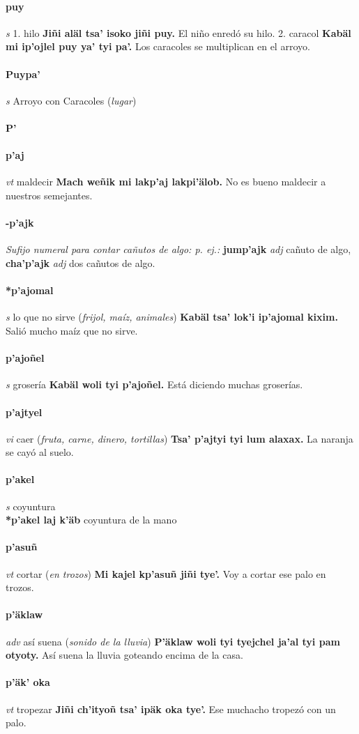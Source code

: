 \documentclass{scrbook}
\newcommand{\entry}[1]{\paragraph{#1}}
\newcommand{\alphaletter}[1]{\addsec{#1}}
\newcommand{\onedefinition}[1]{#1.}
\newcommand{\nontranslationdef}[1]{\textit{#1}}
\newcommand{\partofspeech}[1]{\textit{#1}}
\newcommand{\spanishtranslation}[1]{#1}
\newcommand{\clarification}[1]{(\textit{#1})}
\newcommand{\cholexample}[1]{\textbf{#1}}
\newcommand{\exampletranslation}[1]{#1}
\newcommand{\secondaryentry}[1]{\\\textbf{#1}}
\newcommand{\secondtranslation}[1]{#1}
\begin{document}
\begin{multicols}{2}
\entry{puy}
\partofspeech{s}
\onedefinition{1}
\spanishtranslation{hilo}
\cholexample{Jiñi aläl tsa' isoko jiñi puy.}
\exampletranslation{El niño enredó su hilo.}
\onedefinition{2}
\spanishtranslation{caracol}
\cholexample{Kabäl mi ip'ojlel puy ya' tyi pa'.}
\exampletranslation{Los caracoles se multiplican en el arroyo.}

\entry{Puypa'}
\partofspeech{s}
\spanishtranslation{Arroyo con Caracoles}
\clarification{lugar}

\entry{P'}
\alphaletter{P'}

\entry{p'aj}
\partofspeech{vt}
\spanishtranslation{maldecir}
\cholexample{Mach weñik mi lakp'aj lakpi'älob.}
\exampletranslation{No es bueno maldecir a nuestros semejantes.}

\entry{-p'ajk}
\nontranslationdef{Sufijo numeral para contar cañutos de algo: p. ej.:}
\cholexample{jump'ajk}
\partofspeech{adj}
\exampletranslation{cañuto de algo,}
\cholexample{cha'p'ajk}
\partofspeech{adj}
\exampletranslation{dos cañutos de algo.}

\entry{*p'ajomal}
\partofspeech{s}
\spanishtranslation{lo que no sirve}
\clarification{frijol, maíz, animales}
\cholexample{Kabäl tsa' lok'i ip'ajomal kixim.}
\exampletranslation{Salió mucho maíz que no sirve.}

\entry{p'ajoñel}
\partofspeech{s}
\spanishtranslation{grosería}
\cholexample{Kabäl woli tyi p'ajoñel.}
\exampletranslation{Está diciendo muchas groserías.}

\entry{p'ajtyel}
\partofspeech{vi}
\spanishtranslation{caer}
\clarification{fruta, carne, dinero, tortillas}
\cholexample{Tsa' p'ajtyi tyi lum alaxax.}
\exampletranslation{La naranja se cayó al suelo.}

\entry{p'akel}
\partofspeech{s}
\spanishtranslation{coyuntura}
\secondaryentry{*p'akel laj k'äb}
\secondtranslation{coyuntura de la mano}

\entry{p'asuñ}
\partofspeech{vt}
\spanishtranslation{cortar}
\clarification{en trozos}
\cholexample{Mi kajel kp'asuñ jiñi tye'.}
\exampletranslation{Voy a cortar ese palo en trozos.}

\entry{p'äklaw}
\partofspeech{adv}
\spanishtranslation{así suena}
\clarification{sonido de la lluvia}
\cholexample{P'äklaw woli tyi tyejchel ja'al tyi pam otyoty.}
\exampletranslation{Así suena la lluvia goteando encima de la casa.}

\entry{p'äk' oka}
\partofspeech{vt}
\spanishtranslation{tropezar}
\cholexample{Jiñi ch'ityoñ tsa' ipäk oka tye'.}
\exampletranslation{Ese muchacho tropezó con un palo.}


\end{multicols}
\end{document}
